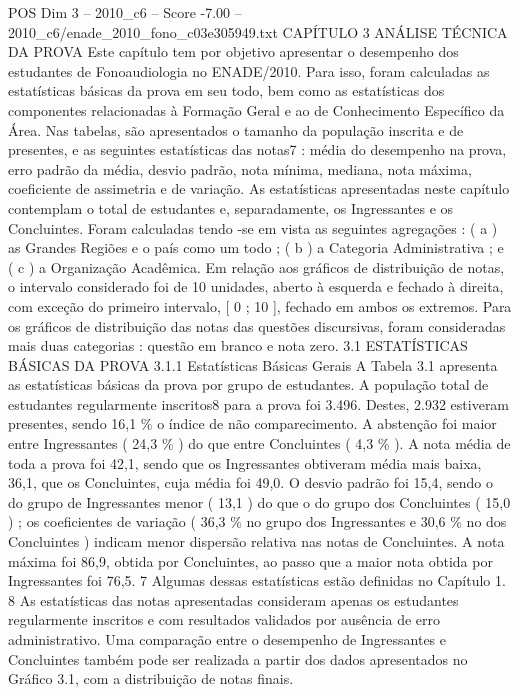 \begin{textsample}{POS Dim 3 – 2010\_c6 – Score -7.00 – 2010\_c6/enade\_2010\_fono\_c03e305949.txt}  \label{ex:f3_pos_275}
CAPÍTULO 3 ANÁLISE TÉCNICA DA PROVA Este capítulo tem por objetivo apresentar o desempenho dos estudantes de Fonoaudiologia no ENADE/2010.
Para isso, foram calculadas as estatísticas básicas da prova em seu todo, bem como as estatísticas dos componentes relacionadas à Formação Geral e ao de Conhecimento Específico da Área.
Nas tabelas, são apresentados o tamanho da população inscrita e de presentes, e as seguintes estatísticas das notas7 : média do desempenho na prova, erro padrão da média, desvio padrão, nota mínima, mediana, nota máxima, coeficiente de assimetria e de variação.
As estatísticas apresentadas neste capítulo contemplam o total de estudantes e, separadamente, os Ingressantes e os Concluintes.
Foram calculadas tendo -se em vista as seguintes agregações : ( a ) as Grandes Regiões e o país como um todo ; ( b ) a Categoria Administrativa ; e ( c ) a Organização Acadêmica.
Em relação aos gráficos de distribuição de notas, o intervalo considerado foi de 10 unidades, aberto à esquerda e fechado à direita, com exceção do primeiro intervalo, [ 0 ; 10 ], fechado em ambos os extremos.
Para os gráficos de distribuição das notas das questões discursivas, foram consideradas mais duas categorias : questão em branco e nota zero. 3.1 ESTATÍSTICAS BÁSICAS DA PROVA 3.1.1 Estatísticas Básicas Gerais A Tabela 3.1 apresenta as estatísticas básicas da prova por grupo de estudantes.
A população total de estudantes regularmente inscritos8 para a prova foi 3.496.
Destes, 2.932 estiveram presentes, sendo 16,1 \% o índice de não comparecimento.
A abstenção foi maior entre Ingressantes ( 24,3 \% ) do que entre Concluintes ( 4,3 \% ).
A nota média de toda a prova foi 42,1, sendo que os Ingressantes obtiveram média mais baixa, 36,1, que os Concluintes, cuja média foi 49,0.
O desvio padrão foi 15,4, sendo o do grupo de Ingressantes menor ( 13,1 ) do que o do grupo dos Concluintes ( 15,0 ) ; os coeficientes de variação ( 36,3 \% no grupo dos Ingressantes e 30,6 \% no dos Concluintes ) indicam menor dispersão relativa nas notas de Concluintes.
A nota máxima foi 86,9, obtida por Concluintes, ao passo que a maior nota obtida por Ingressantes foi 76,5. 7 Algumas dessas estatísticas estão definidas no Capítulo 1. 8 As estatísticas das notas apresentadas consideram apenas os estudantes regularmente inscritos e com resultados validados por ausência de erro administrativo.
Uma comparação entre o desempenho de Ingressantes e Concluintes também pode ser realizada a partir dos dados apresentados no Gráfico 3.1, com a distribuição de notas finais.

\end{textsample}
